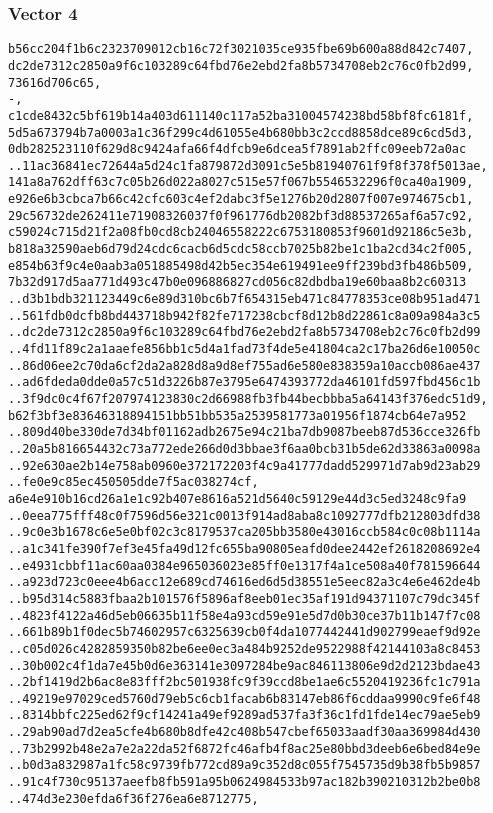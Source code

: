\documentclass[
]{article}
\begin{document}
\hypertarget{vector-4-2}{%
\subsubsection{Vector 4}\label{vector-4-2}}

\begin{verbatim}
b56cc204f1b6c2323709012cb16c72f3021035ce935fbe69b600a88d842c7407,
dc2de7312c2850a9f6c103289c64fbd76e2ebd2fa8b5734708eb2c76c0fb2d99,
73616d706c65,
-,
c1cde8432c5bf619b14a403d611140c117a52ba31004574238bd58bf8fc6181f,
5d5a673794b7a0003a1c36f299c4d61055e4b680bb3c2ccd8858dce89c6cd5d3,
0db282523110f629d8c9424afa66f4dfcb9e6dcea5f7891ab2ffc09eeb72a0ac
..11ac36841ec72644a5d24c1fa879872d3091c5e5b81940761f9f8f378f5013ae,
141a8a762dff63c7c05b26d022a8027c515e57f067b5546532296f0ca40a1909,
e926e6b3cbca7b66c42cfc603c4ef2dabc3f5e1276b20d2807f007e974675cb1,
29c56732de262411e71908326037f0f961776db2082bf3d88537265af6a57c92,
c59024c715d21f2a08fb0cd8cb24046558222c6753180853f9601d92186c5e3b,
b818a32590aeb6d79d24cdc6cacb6d5cdc58ccb7025b82be1c1ba2cd34c2f005,
e854b63f9c4e0aab3a051885498d42b5ec354e619491ee9ff239bd3fb486b509,
7b32d917d5aa771d493c47b0e096886827cd056c82dbdba19e60baa8b2c60313
..d3b1bdb321123449c6e89d310bc6b7f654315eb471c84778353ce08b951ad471
..561fdb0dcfb8bd443718b942f82fe717238cbcf8d12b8d22861c8a09a984a3c5
..dc2de7312c2850a9f6c103289c64fbd76e2ebd2fa8b5734708eb2c76c0fb2d99
..4fd11f89c2a1aaefe856bb1c5d4a1fad73f4de5e41804ca2c17ba26d6e10050c
..86d06ee2c70da6cf2da2a828d8a9d8ef755ad6e580e838359a10accb086ae437
..ad6fdeda0dde0a57c51d3226b87e3795e6474393772da46101fd597fbd456c1b
..3f9dc0c4f67f207974123830c2d66988fb3fb44becbbba5a64143f376edc51d9,
b62f3bf3e83646318894151bb51bb535a2539581773a01956f1874cb64e7a952
..809d40be330de7d34bf01162adb2675e94c21ba7db9087beeb87d536cce326fb
..20a5b816654432c73a772ede266d0d3bbae3f6aa0bcb31b5de62d33863a0098a
..92e630ae2b14e758ab0960e372172203f4c9a41777dadd529971d7ab9d23ab29
..fe0e9c85ec450505dde7f5ac038274cf,
a6e4e910b16cd26a1e1c92b407e8616a521d5640c59129e44d3c5ed3248c9fa9
..0eea775fff48c0f7596d56e321c0013f914ad8aba8c1092777dfb212803dfd38
..9c0e3b1678c6e5e0bf02c3c8179537ca205bb3580e43016ccb584c0c08b1114a
..a1c341fe390f7ef3e45fa49d12fc655ba90805eafd0dee2442ef2618208692e4
..e4931cbbf11ac60aa0384e965036023e85ff0e1317f4a1ce508a40f781596644
..a923d723c0eee4b6acc12e689cd74616ed6d5d38551e5eec82a3c4e6e462de4b
..b95d314c5883fbaa2b101576f5896af8eeb01ec35af191d94371107c79dc345f
..4823f4122a46d5eb06635b11f58e4a93cd59e91e5d7d0b30ce37b11b147f7c08
..661b89b1f0dec5b74602957c6325639cb0f4da1077442441d902799eaef9d92e
..c05d026c4282859350b82be6ee0ec3a484b9252de9522988f42144103a8c8453
..30b002c4f1da7e45b0d6e363141e3097284be9ac846113806e9d2d2123bdae43
..2bf1419d2b6ac8e83fff2bc501938fc9f39ccd8be1ae6c5520419236fc1c791a
..49219e97029ced5760d79eb5c6cb1facab6b83147eb86f6cddaa9990c9fe6f48
..8314bbfc225ed62f9cf14241a49ef9289ad537fa3f36c1fd1fde14ec79ae5eb9
..29ab90ad7d2ea5cfe4b680b8dfe42c408b547cbef65033aadf30aa369984d430
..73b2992b48e2a7e2a22da52f6872fc46afb4f8ac25e80bbd3deeb6e6bed84e9e
..b0d3a832987a1fc58c9739fb772cd89a9c352d8c055f7545735d9b38fb5b9857
..91c4f730c95137aeefb8fb591a95b0624984533b97ac182b390210312b2be0b8
..474d3e230efda6f36f276ea6e8712775,
\end{verbatim}
\end{document}
